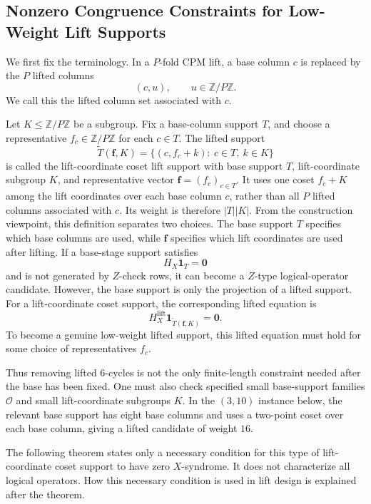 \documentclass[11pt,a4paper]{article}
\newcommand{\HX}{H_X}
\newcommand{\HXL}{H_X^{\mathrm{lift}}}
\newcommand{\vect}[1]{\bm{#1}}
\theoremstyle{uprighttheorem}
\begin{document}
\subsection{Nonzero Congruence Constraints for Low-Weight Lift Supports}\label{subsec:lift-coordinate-coset-support-exclusion}

We first fix the terminology.
In a \(P\)-fold CPM lift, a base column \(c\) is replaced by the \(P\) lifted columns
\[
  (c,u),\qquad u\in\mathbb Z/P\mathbb Z .
\]
We call this the lifted column set associated with \(c\).

Let \(K\le\mathbb Z/P\mathbb Z\) be a subgroup.
Fix a base-column support \(T\), and choose a representative \(f_c\in\mathbb Z/P\mathbb Z\) for each \(c\in T\).
The lifted support
\[
  \widetilde T(\bm f,K)
  =
  \{(c,f_c+k):\ c\in T,\ k\in K\}
\]
is called the lift-coordinate coset lift support with base support \(T\), lift-coordinate subgroup \(K\), and representative vector \(\bm f=(f_c)_{c\in T}\).
It uses one coset \(f_c+K\) among the lift coordinates over each base column \(c\), rather than all \(P\) lifted columns associated with \(c\).
Its weight is therefore \(|T||K|\).
From the construction viewpoint, this definition separates two choices.
The base support \(T\) specifies which base columns are used, while \(\bm f\) specifies which lift coordinates are used after lifting.
If a base-stage support satisfies
\[
  \HX\vect{1}_T=\vect{0}
\]
and is not generated by \(Z\)-check rows, it can become a \(Z\)-type logical-operator candidate.
However, the base support is only the projection of a lifted support.
For a lift-coordinate coset support, the corresponding lifted equation is
\[
  \HXL\vect{1}_{\widetilde T(\bm f,K)}=\vect{0}.
\]
To become a genuine low-weight lifted support, this lifted equation must hold for some choice of representatives \(f_c\).

Thus removing lifted 6-cycles is not the only finite-length constraint needed after the base has been fixed.
One must also check specified small base-support families \(\mathcal O\) and small lift-coordinate subgroups \(K\).
In the \((3,10)\) instance below, the relevant base support has eight base columns and uses a two-point coset over each base column, giving a lifted candidate of weight \(16\).

The following theorem states only a necessary condition for this type of lift-coordinate coset support to have zero \(X\)-syndrome.
It does not characterize all logical operators.
How this necessary condition is used in lift design is explained after the theorem.
\end{document}
